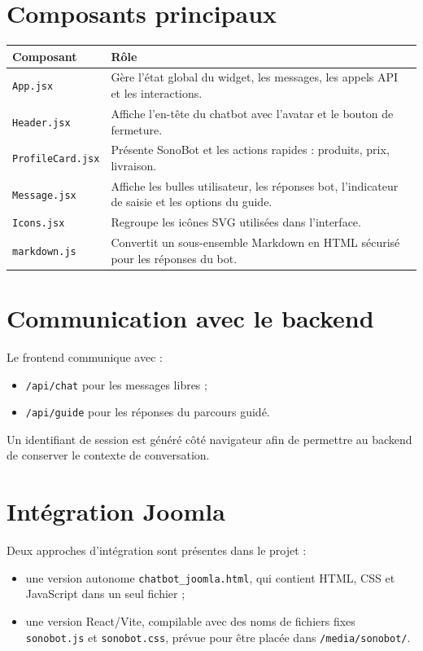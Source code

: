 \documentclass[12pt,a4paper]{report}
\begin{document}
\section{Composants principaux}

\begin{longtable}{p{5cm}p{9cm}}
\toprule
\textbf{Composant} & \textbf{Rôle} \\
\midrule
\texttt{App.jsx} & Gère l'état global du widget, les messages, les appels API et les interactions. \\
\texttt{Header.jsx} & Affiche l'en-tête du chatbot avec l'avatar et le bouton de fermeture. \\
\texttt{ProfileCard.jsx} & Présente SonoBot et les actions rapides : produits, prix, livraison. \\
\texttt{Message.jsx} & Affiche les bulles utilisateur, les réponses bot, l'indicateur de saisie et les options du guide. \\
\texttt{Icons.jsx} & Regroupe les icônes SVG utilisées dans l'interface. \\
\texttt{markdown.js} & Convertit un sous-ensemble Markdown en HTML sécurisé pour les réponses du bot. \\
\bottomrule
\end{longtable}

\section{Communication avec le backend}

Le frontend communique avec :

\begin{itemize}
    \item \texttt{/api/chat} pour les messages libres ;
    \item \texttt{/api/guide} pour les réponses du parcours guidé.
\end{itemize}

Un identifiant de session est généré côté navigateur afin de permettre au backend de conserver le contexte de conversation.

\section{Intégration Joomla}

Deux approches d'intégration sont présentes dans le projet :

\begin{itemize}
    \item une version autonome \texttt{chatbot\_joomla.html}, qui contient HTML, CSS et JavaScript dans un seul fichier ;
    \item une version React/Vite, compilable avec des noms de fichiers fixes \texttt{sonobot.js} et \texttt{sonobot.css}, prévue pour être placée dans \texttt{/media/sonobot/}.
\end{itemize}
\end{document}
